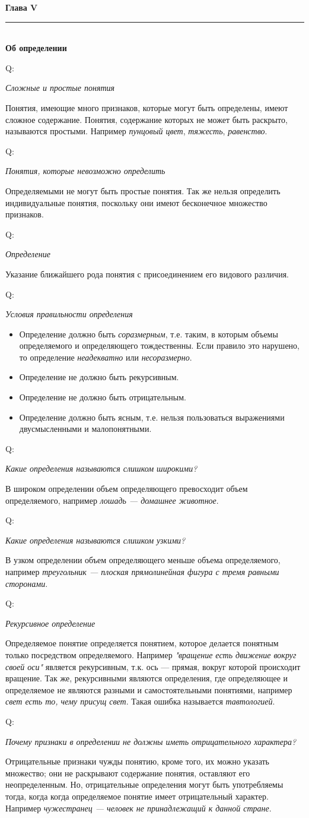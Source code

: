 \documentclass{article}
\newcommand{\note}[1]{\textit{#1}}
\renewcommand{\section}[2]{
	\vspace{6em}
	\begin{flushright}
		\Large
		\baselineskip=0.5\baselineskip
		\textbf{#1}
		\\
		\rule[0.5\baselineskip]{\textwidth}{0.15pt}
		\\
		\textbf{#2}
	\end{flushright}
}
\newcommand{\question}[2]{
	\begin{flushright}
		Q:\hspace{2ex}\vline\hspace{2ex}
		\begin{minipage}{0.9\textwidth}
			\large
			\textit{#1}
		\end{minipage}
	\end{flushright}
	\begin{center}
		\begin{minipage}{0.95\textwidth}
			#2
		\end{minipage}
	\end{center}
}
\begin{document}
\section{Глава V}{Об определении}
\question{Сложные и простые понятия}{Понятия, имеющие много признаков, которые могут быть определены, имеют сложное содержание. Понятия, содержание которых не может быть раскрыто, называются простыми. Например \note{пунцовый цвет}, \note{тяжесть}, \note{равенство}.}
\question{Понятия, которые невозможно определить}{Определяемыми не могут быть простые понятия. Так же нельзя определить индивидуальные понятия, поскольку они имеют бесконечное множество признаков.}
\question{Определение}{Указание ближайшего рода понятия с присоединением его видового различия.}
\question{Условия правильности определения}{
	\begin{itemize}
		\item Определение должно быть \note{соразмерным}, т.е. таким, в которым объемы определяемого и определяющего тождественны. Если правило это нарушено, то определение \note{неадекватно} или \note{несоразмерно}.
		\item Определение не должно быть рекурсивным.
		\item Определение не должно быть отрицательным.
		\item Определение должно быть ясным, т.е. нельзя пользоваться выражениями двусмысленными и малопонятными.
	\end{itemize}}
\question{Какие определения называются слишком широкими?}{В широком определении объем определяющего превосходит объем определяемого, например \note{лошадь --- домашнее животное}.}
\question{Какие определения называются слишком узкими?}{В узком определении объем определяющего меньше объема определяемого, например \note{треугольник --- плоская прямолинейная фигура с тремя равными сторонами}.}
\question{Рекурсивное определение}{Определяемое понятие определяется понятием, которое делается понятным только посредством определяемого. Например \note{"вращение есть движение вокруг своей оси"} является рекурсивным, т.к. ось --- прямая, вокруг которой происходит вращение. Так же, рекурсивными являются определения, где определяющее и определяемое не являются разными и самостоятельными понятиями, например \note{свет есть то, чему присущ свет}. Такая ошибка называется \note{тавтологией}.}
\question{Почему признаки в определении не должны иметь отрицательного характера?}{Отрицательные признаки чужды понятию, кроме того, их можно указать множество; они не раскрывают содержание понятия, оставляют его неопределенным. Но, отрицательные определения могут быть употребляемы тогда, когда когда определяемое понятие имеет отрицательный характер. Например \note{чужестранец --- человек не принадлежащий к данной стране}.}
\end{document}
